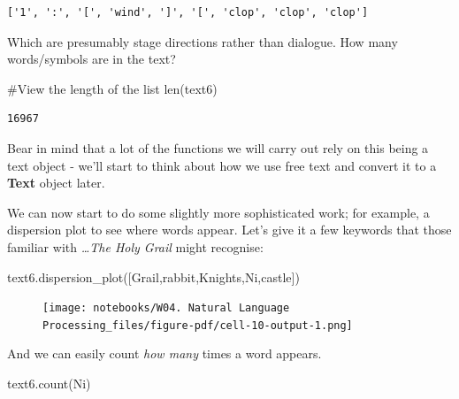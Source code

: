 \documentclass[
  letterpaper,
  DIV=11,
  numbers=noendperiod]{scrreprt}
\newenvironment{Shaded}{\begin{snugshade}}{\end{snugshade}}
\newcommand{\BuiltInTok}[1]{\textcolor[rgb]{0.00,0.23,0.31}{#1}}
\newcommand{\CommentTok}[1]{\textcolor[rgb]{0.37,0.37,0.37}{#1}}
\newcommand{\NormalTok}[1]{\textcolor[rgb]{0.00,0.23,0.31}{#1}}
\newcommand{\StringTok}[1]{\textcolor[rgb]{0.13,0.47,0.30}{#1}}
\begin{document}
\begin{verbatim}
['1', ':', '[', 'wind', ']', '[', 'clop', 'clop', 'clop']
\end{verbatim}

Which are presumably stage directions rather than dialogue. How many
words/symbols are in the text?

\begin{Shaded}
\begin{Highlighting}[]
\CommentTok{\#View the length of the list}
\BuiltInTok{len}\NormalTok{(text6)}
\end{Highlighting}
\end{Shaded}

\begin{verbatim}
16967
\end{verbatim}

Bear in mind that a lot of the functions we will carry out rely on this
being a text object - we'll start to think about how we use free text
and convert it to a \textbf{Text} object later.

We can now start to do some slightly more sophisticated work; for
example, a dispersion plot to see where words appear. Let's give it a
few keywords that those familiar with \emph{\ldots The Holy Grail} might
recognise:

\begin{Shaded}
\begin{Highlighting}[]
\NormalTok{text6.dispersion\_plot([}\StringTok{\textquotesingle{}Grail\textquotesingle{}}\NormalTok{,}\StringTok{\textquotesingle{}rabbit\textquotesingle{}}\NormalTok{,}\StringTok{\textquotesingle{}Knights\textquotesingle{}}\NormalTok{,}\StringTok{\textquotesingle{}Ni\textquotesingle{}}\NormalTok{,}\StringTok{\textquotesingle{}castle\textquotesingle{}}\NormalTok{])}
\end{Highlighting}
\end{Shaded}

\begin{figure}[H]

{\centering \texttt{[image: notebooks/W04. Natural Language Processing\_files/figure-pdf/cell-10-output-1.png]}

}

\end{figure}

And we can easily count \emph{how many} times a word appears.

\begin{Shaded}
\begin{Highlighting}[]
\NormalTok{text6.count(}\StringTok{\textquotesingle{}Ni\textquotesingle{}}\NormalTok{)}
\end{Highlighting}
\end{Shaded}
\end{document}
